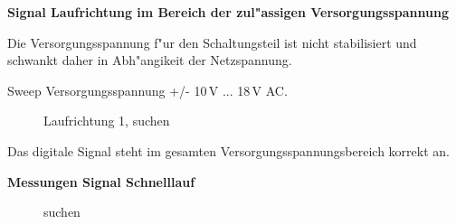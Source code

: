 \documentclass[ngerman,11pt,parskip=half] {scrartcl}
\newcommand {\tscopesize}{12cm}
\begin{document}
\textbf{Signal Laufrichtung im Bereich der zul"assigen Versorgungsspannung}

Die Versorgungsspannung f"ur den Schaltungsteil ist nicht stabilisiert und schwankt daher in Abh"angikeit der Netzspannung.

Sweep Versorgungsspannung +/- 10\,V ... 18\,V AC. 

\begin{figure}[H]
\centering
{}
\caption{Laufrichtung 1, suchen} \label{fig:1}
\end{figure}

Das digitale Signal steht im gesamten Versorgungsspannungsbereich korrekt an. 

\textbf{Messungen Signal Schnelllauf}

\begin{figure}[H]
\centering
{}
\caption{suchen} \label{fig:1}
\end{figure}
\end{document}

